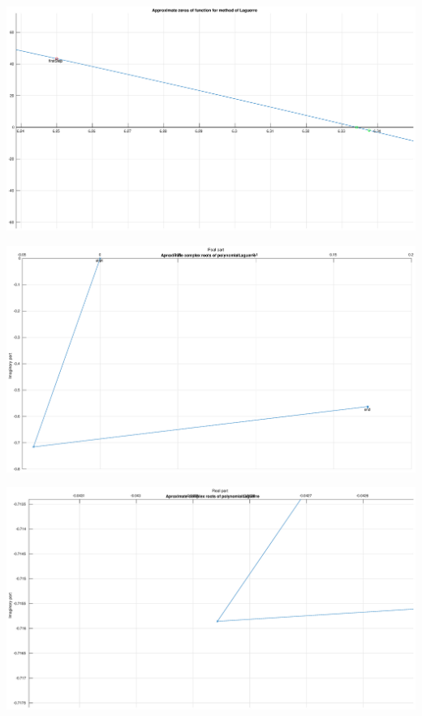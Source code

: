 \documentclass[12pt]{report}
\begin{document}
\begin{center}
   \includegraphics[scale=0.25]{task3right.eps}
\end{center}

\begin{center}
   \includegraphics[scale=0.25]{task3complexoverall.eps}
\end{center}

\begin{center}
   \includegraphics[scale=0.25]{task3complexleft.eps}
\end{center}
\end{document}

